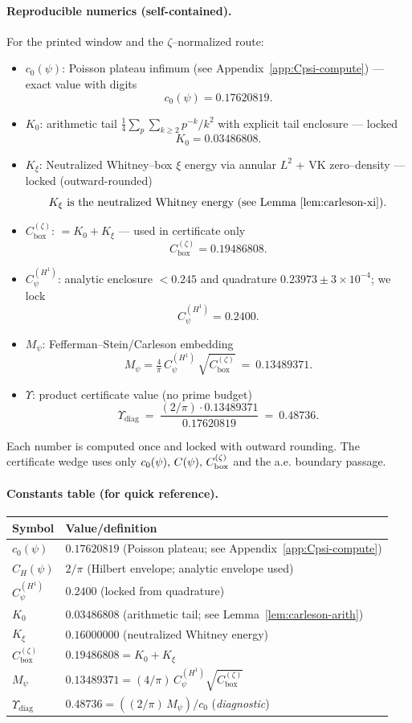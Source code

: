 \documentclass[11pt]{article}
\providecommand{\czeroplateau}{0.17620819}%
\providecommand{\Kxi}{K_\xi}
\providecommand{\CboxZeta}{K_0 + K_\xi}%
\providecommand{\CHone}{2/\pi}%
\providecommand{\CpsiHone}{0.2400}%
\providecommand{\Mpsilocked}{(4/\pi)\,\CpsiHone\,\sqrt{\CboxZeta}}
\providecommand{\UpsilonLocked}{(2/\pi)\,\Mpsilocked/\czeroplateau}%
\renewcommand{\Kxi}{0.16000000}
\renewcommand{\CboxZeta}{0.19486808}
\renewcommand{\Mpsilocked}{0.13489371}
\renewcommand{\UpsilonLocked}{0.48736}
\theoremstyle{definition}
\theoremstyle{remark}
\theoremstyle{definition}
\begin{document}
\paragraph{Reproducible numerics (self-contained).}
For the printed window and the \(\zeta\)–normalized route:
\begin{itemize}
\item \(c_0(\psi)\): Poisson plateau infimum (see Appendix~\ref{app:Cpsi-compute}) — exact value with digits
\[ c_0(\psi)=0.17620819. \]
\item \(K_0\): arithmetic tail \(\tfrac14\sum_{p}\sum_{k\ge2} p^{-k}/k^2\) with explicit tail enclosure — locked
\[ K_0=0.03486808. \]
\item \(K_\xi\): Neutralized Whitney–box \(\xi\) energy via annular $L^2$ + VK zero–density — locked (outward-rounded)
\[ K_\xi \text{ is the neutralized Whitney energy (see Lemma~\ref{lem:carleson-xi}).} \]
\item \(C_{\mathrm{box}}^{(\zeta)}\): $=K_0+K_\xi$ — used in certificate only
\[ C_{\mathrm{box}}^{(\zeta)}=\CboxZeta. \]
\item \(C_\psi^{(H^1)}\): analytic enclosure $<0.245$ and quadrature $0.23973\pm3\times10^{-4}$; we lock
\[ C_\psi^{(H^1)}=0.2400. \]
\item \(M_\psi\): Fefferman–Stein/Carleson embedding
\[ M_\psi=\tfrac{4}{\pi}\,C_\psi^{(H^1)}\,\sqrt{C_{\mathrm{box}}^{(\zeta)}}\ =\ \Mpsilocked. \]
\item \(\Upsilon\): product certificate value (no prime budget)
\[ \Upsilon_{\mathrm{diag}}\ =\ \frac{(2/\pi)\cdot \Mpsilocked}{0.17620819}\ =\ \UpsilonLocked. \]
\end{itemize}
Each number is computed once and locked with outward rounding. The certificate wedge uses only \(c_0(\psi),\,C(\psi),\,C_{\rm box}^{(\zeta)}\) and the a.e. boundary passage.
\paragraph{Constants table (for quick reference).}
\begin{center}
\begin{tabular}{ll}
\toprule
Symbol & Value/definition \\
\midrule
$c_0(\psi)$ & $\czeroplateau$ (Poisson plateau; see Appendix~\ref{app:Cpsi-compute}) \\
$C_H(\psi)$ & $\CHone$ (Hilbert envelope; analytic envelope used) \\
$C_\psi^{(H^1)}$ & $\CpsiHone$ (locked from quadrature) \\
$K_0$ & $0.03486808$ (arithmetic tail; see Lemma~\ref{lem:carleson-arith}) \\
$K_\xi$ & $\Kxi$ (neutralized Whitney energy) \\
$C_{\mathrm{box}}^{(\zeta)}$ & $\CboxZeta=K_0+K_\xi$ \\
$M_\psi$ & $\Mpsilocked=(4/\pi)\,C_\psi^{(H^1)}\sqrt{C_{\mathrm{box}}^{(\zeta)}}$ \\
\(\Upsilon_{\mathrm{diag}}\) & $\UpsilonLocked=((2/\pi)\,M_\psi)/c_0$ \quad(\emph{diagnostic})\\
\bottomrule
\end{tabular}
\end{center}
\end{document}
